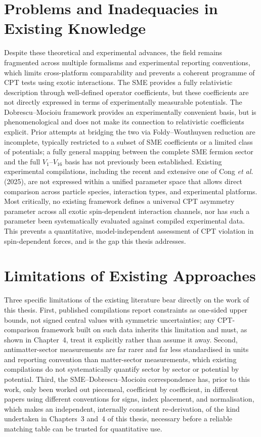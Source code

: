 \section{Problems and Inadequacies in Existing Knowledge}
\label{sec:gap}

Despite these theoretical and experimental advances, the field remains
fragmented across multiple formalisms and experimental reporting
conventions, which limits cross-platform comparability and prevents a
coherent programme of CPT tests using exotic interactions. The SME
provides a fully relativistic description through well-defined operator
coefficients, but these coefficients are not directly expressed in terms
of experimentally measurable potentials. The Dobrescu--Mocioiu framework
provides an experimentally convenient basis, but is phenomenological and
does not make its connection to relativistic coefficients explicit. Prior
attempts at bridging the two via Foldy--Wouthuysen reduction are
incomplete, typically restricted to a subset of SME coefficients or a
limited class of potentials; a fully general mapping between the complete
SME fermion sector and the full $V_1$--$V_{16}$ basis has not previously
been established. Existing experimental compilations, including the recent
and extensive one of Cong \textit{et al.} (2025), are not expressed within
a unified parameter space that allows direct comparison across particle
species, interaction types, and experimental platforms. Most critically, no
existing framework defines a universal CPT asymmetry parameter across all
exotic spin-dependent interaction channels, nor has such a parameter been
systematically evaluated against compiled experimental data. This prevents
a quantitative, model-independent assessment of CPT violation in
spin-dependent forces, and is the gap this thesis addresses.

\section{Limitations of Existing Approaches}
\label{sec:existing-limitations}

Three specific limitations of the existing literature bear directly on the
work of this thesis. First, published compilations report constraints as
one-sided upper bounds, not signed central values with symmetric
uncertainties; any CPT-comparison framework built on such data inherits
this limitation and must, as shown in Chapter~4, treat it explicitly rather
than assume it away. Second, antimatter-sector measurements are far rarer
and far less standardised in units and reporting convention than
matter-sector measurements, which existing compilations do not
systematically quantify sector by sector or potential by potential. Third,
the SME--Dobrescu--Mocioiu correspondence has, prior to this work, only
been worked out piecemeal, coefficient by coefficient, in different papers
using different conventions for signs, index placement, and normalisation,
which makes an independent, internally consistent re-derivation, of the
kind undertaken in Chapters~3 and~4 of this thesis, necessary before a
reliable matching table can be trusted for quantitative use.
